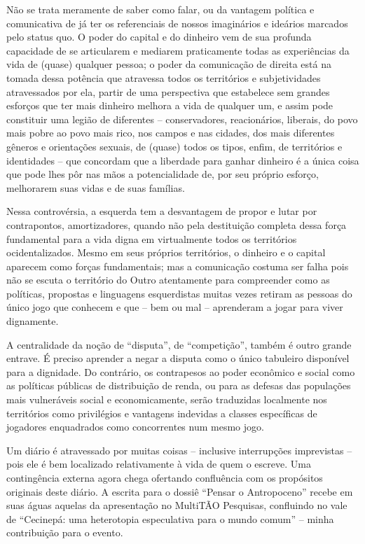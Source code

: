 Não se trata meramente de saber como falar, ou da vantagem política e comunicativa de já ter os referenciais de nossos imaginários e ideários marcados pelo status quo. O poder do capital e do dinheiro vem de sua profunda capacidade de se articularem e mediarem praticamente todas as experiências da vida de (quase) qualquer pessoa; o poder da comunicação de direita está na tomada dessa potência que atravessa todos os territórios e subjetividades atravessados por ela, partir de uma perspectiva que estabelece sem grandes esforços que ter mais dinheiro melhora a vida de qualquer um, e assim pode constituir uma legião de diferentes -- conservadores, reacionários, liberais, do povo mais pobre ao povo mais rico, nos campos e nas cidades, dos mais diferentes gêneros e orientações sexuais, de (quase) todos os tipos, enfim, de territórios e identidades -- que concordam que a liberdade para ganhar dinheiro é a única coisa que pode lhes pôr nas mãos a potencialidade de, por seu próprio esforço, melhorarem suas vidas e de suas famílias.

Nessa controvérsia, a esquerda tem a desvantagem de propor e lutar por contrapontos, amortizadores, quando não pela destituição completa dessa força fundamental para a vida digna em virtualmente todos os territórios ocidentalizados. Mesmo em seus próprios territórios, o dinheiro e o capital aparecem como forças fundamentais; mas a comunicação costuma ser falha pois não se escuta o território do Outro atentamente para compreender como as políticas, propostas e linguagens esquerdistas muitas vezes retiram as pessoas do único jogo que conhecem e que -- bem ou mal -- aprenderam a jogar para viver dignamente.

A centralidade da noção de \enquote{disputa}, de \enquote{competição}, também é outro grande entrave. É preciso aprender a negar a disputa como o único tabuleiro disponível para a dignidade. Do contrário, os contrapesos ao poder econômico e social como as políticas públicas de distribuição de renda, ou para as defesas das populações mais vulneráveis social e economicamente, serão traduzidas localmente nos territórios como privilégios e vantagens indevidas a classes específicas de jogadores enquadrados como concorrentes num mesmo jogo.

Um diário é atravessado por muitas coisas -- inclusive interrupções imprevistas -- pois ele é bem localizado relativamente à vida de quem o escreve. Uma contingência externa agora chega ofertando confluência com os propósitos originais deste diário. A escrita para o dossiê \enquote{Pensar o Antropoceno} recebe em suas águas aquelas da apresentação no MultiTÃO Pesquisas, confluindo no vale de \enquote{Cecinepá: uma heterotopia especulativa para o mundo comum} -- minha contribuição para o evento.

